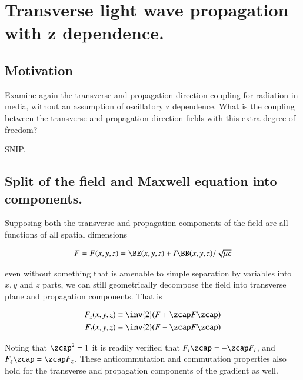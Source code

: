 %

\chapter{Transverse light wave propagation with z dependence.}
\label{chap:maxwellHomoFirstOrder}
{}
\date{Aug 9, 2009}

\beginArtWithToc

\section{Motivation}

Examine again the transverse and propagation direction coupling for radiation in media, without an assumption of oscillatory z dependence.  What is the coupling between the transverse and propagation direction fields with this extra degree of freedom?

SNIP.
\section{Split of the field and Maxwell equation into components.}

Supposing both the transverse and propagation components of the field are all functions of all spatial dimensions

\begin{align}\label{eqn:foo4}
F = F(x,y,z) = \BE(x,y,z) + I\BB(x,y,z)/\sqrt{\mu\epsilon}
\end{align}

even without something that is amenable to simple separation by variables into $x,y$ and $z$ parts, we can still geometrically decompose the field into transverse plane and propagation components.  That is

\begin{align}\label{eqn:foo5}
F_z(x,y,z) &\equiv \inv{2}(F + \zcap F \zcap) \\
F_t(x,y,z) &\equiv \inv{2}(F - \zcap F \zcap)
\end{align}

Noting that $\zcap^2 = 1$ it is readily verified that $F_t \zcap = - \zcap F_t$, and $F_z \zcap = \zcap F_z$.  These anticommutation and commutation properties also hold for the transverse and propagation components of the gradient as well.

